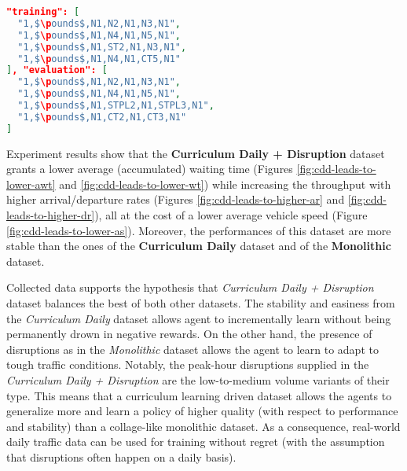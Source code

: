 \noindent
\begin{minipage}{\linewidth}
\begin{lstlisting}[language=JSON, caption=The schema for the "Curriculum Daily + Disruption" Dataset, label={lst:dataset-schema-curriculum-daily-plus-disruption}, mathescape=true]
"training": [
  "1,$\pounds$,N1,N2,N1,N3,N1",
  "1,$\pounds$,N1,N4,N1,N5,N1",
  "1,$\pounds$,N1,ST2,N1,N3,N1",
  "1,$\pounds$,N1,N4,N1,CT5,N1"
], "evaluation": [
  "1,$\pounds$,N1,N2,N1,N3,N1",
  "1,$\pounds$,N1,N4,N1,N5,N1",
  "1,$\pounds$,N1,STPL2,N1,STPL3,N1",
  "1,$\pounds$,N1,CT2,N1,CT3,N1"
]
\end{lstlisting}
\end{minipage}

Experiment results show that the \textbf{Curriculum Daily + Disruption} dataset grants a lower average (accumulated) waiting time (Figures \ref{fig:cdd-leads-to-lower-awt} and \ref{fig:cdd-leads-to-lower-wt}) while increasing the throughput with higher arrival/departure rates (Figures \ref{fig:cdd-leads-to-higher-ar} and \ref{fig:cdd-leads-to-higher-dr}), all at the cost of a lower average vehicle speed (Figure \ref{fig:cdd-leads-to-lower-as}). Moreover, the performances of this dataset are more stable than the ones of the \textbf{Curriculum Daily} dataset and of the \textbf{Monolithic} dataset.

Collected data supports the hypothesis that \textit{Curriculum Daily + Disruption} dataset balances the best of both other datasets.
The stability and easiness from the \textit{Curriculum Daily} dataset allows agent to incrementally learn without being permanently drown in negative rewards.
On the other hand, the presence of disruptions as in the \textit{Monolithic} dataset allows the agent to learn to adapt to tough traffic conditions.
Notably, the peak-hour disruptions supplied in the \textit{Curriculum Daily + Disruption} are the low-to-medium volume variants of their type.
This means that a curriculum learning driven dataset allows the agents to generalize more and learn a policy of higher quality (with respect to performance and stability) than a collage-like monolithic dataset.
As a consequence, real-world daily traffic data can be used for training without regret (with the assumption that disruptions often happen on a daily basis).



